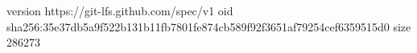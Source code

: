 version https://git-lfs.github.com/spec/v1
oid sha256:35e37db5a9f522b131b11fb7801fe874cb589f92f3651af79254cef6359515d0
size 286273
